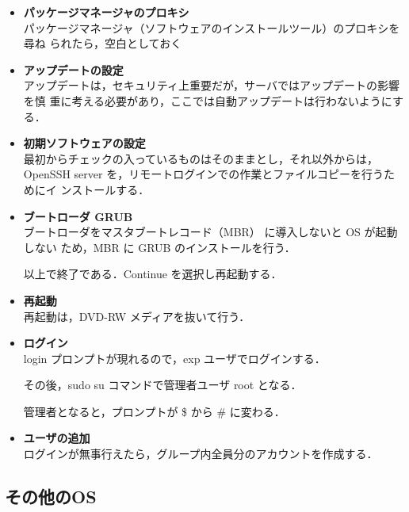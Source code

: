 \begin{itemize}
\item{\bf パッケージマネージャのプロキシ}\\

パッケージマネージャ（ソフトウェアのインストールツール）のプロキシを尋ね
られたら，空白としておく%

\item{\bf アップデートの設定}\\

アップデートは，セキュリティ上重要だが，サーバではアップデートの影響を慎
重に考える必要があり，ここでは自動アップデートは行わないようにする．

\item{\bf 初期ソフトウェアの設定}\\

最初からチェックの入っているものはそのままとし，それ以外からは，OpenSSH
     server を，リモートログインでの作業とファイルコピーを行うためにイ
     ンストールする．

\item{\bf ブートローダ GRUB}\\

ブートローダをマスタブートレコード（MBR） に導入しないと OS が起動しない
     ため，MBR に GRUB のインストールを行う．

以上で終了である．Continue を選択し再起動する．

\item{\bf 再起動}\\
再起動は，DVD-RW メディアを抜いて行う．

\item{\bf ログイン}\\
login プロンプトが現れるので，exp ユーザでログインする．

その後，sudo su コマンドで管理者ユーザ root となる．


管理者となると，プロンプトが \$ から \# に変わる．

\item{\bf ユーザの追加}\\
ログインが無事行えたら，グループ内全員分のアカウントを作成する．

\end{itemize}

\subsection{その他のOS}

